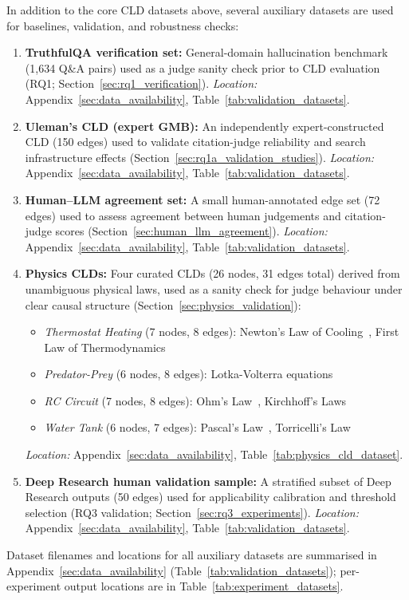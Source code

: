 In addition to the core CLD datasets above, several auxiliary datasets are used for baselines, validation, and robustness checks:
\begin{enumerate}[noitemsep]
    \item \textbf{TruthfulQA verification set:} General-domain hallucination benchmark (1,634 Q\&A pairs) used as a judge sanity check prior to CLD evaluation (RQ1; Section~\ref{sec:rq1_verification}). \textit{Location:} Appendix~\ref{sec:data_availability}, Table~\ref{tab:validation_datasets}.
    \item \textbf{Uleman's CLD (expert GMB):} An independently expert-constructed CLD (150 edges) used to validate citation-judge reliability and search infrastructure effects (Section~\ref{sec:rq1a_validation_studies}). \textit{Location:} Appendix~\ref{sec:data_availability}, Table~\ref{tab:validation_datasets}.
    \item \textbf{Human--LLM agreement set:} A small human-annotated edge set (72 edges) used to assess agreement between human judgements and citation-judge scores (Section~\ref{sec:human_llm_agreement}). \textit{Location:} Appendix~\ref{sec:data_availability}, Table~\ref{tab:validation_datasets}.
    \item \textbf{Physics CLDs:} Four curated CLDs (26 nodes, 31 edges total) derived from unambiguous physical laws, used as a sanity check for judge behaviour under clear causal structure (Section~\ref{sec:physics_validation}):
    \begin{itemize}[noitemsep,topsep=2pt]
        \item \textit{Thermostat Heating} (7 nodes, 8 edges): Newton's Law of Cooling~\cite{newton1701scala}, First Law of Thermodynamics~\cite{clausius1850heat}
        \item \textit{Predator-Prey} (6 nodes, 8 edges): Lotka-Volterra equations~\cite{lotka1925elements,volterra1928fluctuations}
        \item \textit{RC Circuit} (7 nodes, 8 edges): Ohm's Law~\cite{ohm1827galvanische}, Kirchhoff's Laws~\cite{kirchhoff1845durchgang}
        \item \textit{Water Tank} (6 nodes, 7 edges): Pascal's Law~\cite{pascal1663equilibre}, Torricelli's Law~\cite{torricelli1644opera}
    \end{itemize}
    \textit{Location:} Appendix~\ref{sec:data_availability}, Table~\ref{tab:physics_cld_dataset}.
    \item \textbf{Deep Research human validation sample:} A stratified subset of Deep Research outputs (50 edges) used for applicability calibration and threshold selection (RQ3 validation; Section~\ref{sec:rq3_experiments}). \textit{Location:} Appendix~\ref{sec:data_availability}, Table~\ref{tab:validation_datasets}.
\end{enumerate}
Dataset filenames and locations for all auxiliary datasets are summarised in Appendix~\ref{sec:data_availability} (Table~\ref{tab:validation_datasets}); per-experiment output locations are in Table~\ref{tab:experiment_datasets}.

